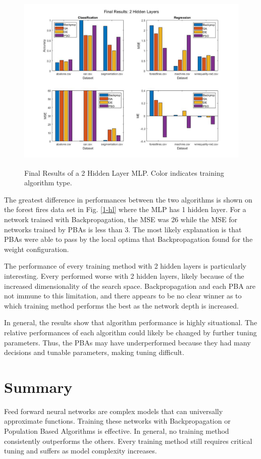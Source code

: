 \documentclass[twoside,11pt]{article}
\begin{document}
	\begin{figure}[h]
		\centering
		\includegraphics[height=3.5in]{FINAL_FIGS/2_hl.jpg}
		\caption{Final Results of a 2 Hidden Layer MLP. Color indicates training algorithm type.}
		\label{2-hl}
	\end{figure}

	The greatest difference in performances between the two algorithms is shown on the forest fires data set in Fig. \ref{1-hl} where the MLP has 1 hidden layer.
	For a network trained with Backpropagation, the MSE was 26 while the MSE for networks trained by PBAs is less than 3.
	The most likely explanation is that PBAs were able to pass by the local optima that Backpropagation found for the weight configuration.

	The performance of every training method with 2 hidden layers is particularly interesting. Every performed worse with 2 hidden layers, likely because of the increased dimensionality of the search space. Backpropagation and each PBA are not immune to this limitation, and there appears to be no clear winner as to which training method performs the best as the network depth is increased.

	In general, the results show that algorithm performance is highly situational. The relative performances of each algorithm could likely be changed by further tuning parameters. Thus, the PBAs may have underperformed because they had many decisions and tunable parameters, making tuning difficult.

	

\section{Summary}

Feed forward neural networks are complex models that can universally approximate functions. Training these networks with Backpropagation or Population Based Algorithms is effective. In general, no training method consistently outperforms the others. Every training method still requires critical tuning and suffers as model complexity increases.

\newpage


\end{document}
